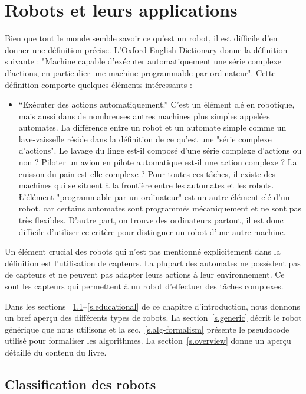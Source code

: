 
\chapter{Robots et leurs applications}\label{ch.basic}

Bien que tout le monde semble savoir ce qu'est un robot, il est difficile d'en donner une définition précise. L'Oxford English Dictionary donne la définition suivante : "Machine capable d'exécuter automatiquement une série complexe d'actions, en particulier une machine programmable par ordinateur". Cette définition comporte quelques éléments intéressants :
\begin{itemize}
\item ``Exécuter des actions automatiquement.'' C'est un élément clé en robotique, mais aussi dans de nombreuses autres machines plus simples appelées automates. La différence entre un robot et un automate simple comme un lave-vaisselle réside dans la définition de ce qu'est une "série complexe d'actions". Le lavage du linge est-il composé d'une série complexe d'actions ou non ? Piloter un avion en pilote automatique est-il une action complexe ? La cuisson du pain est-elle complexe ? Pour toutes ces tâches, il existe des machines qui se situent à la frontière entre les automates et les robots.
\L'élément "programmable par un ordinateur" est un autre élément clé d'un robot, car certains automates sont programmés mécaniquement et ne sont pas très flexibles. D'autre part, on trouve des ordinateurs partout, il est donc difficile d'utiliser ce critère pour distinguer un robot d'une autre machine.
\end{itemize}
Un élément crucial des robots qui n'est pas mentionné explicitement dans la définition est l'utilisation de capteurs. La plupart des automates ne possèdent pas de capteurs et ne peuvent pas adapter leurs actions à leur environnement. Ce sont les capteurs qui permettent à un robot d'effectuer des tâches complexes. 

Dans les sections ~\ref{s.classification}--\ref{s.educational} de ce chapitre d'introduction, nous donnons un bref aperçu des différents types de robots. La section~\ref{s.generic} décrit le robot générique que nous utilisons et la sec.~\ref{s.alg-formalism} présente le pseudocode utilisé pour formaliser les algorithmes. La section~\ref{s.overview} donne un aperçu détaillé du contenu du livre.

\section{Classification des robots}\label{s.classification}

